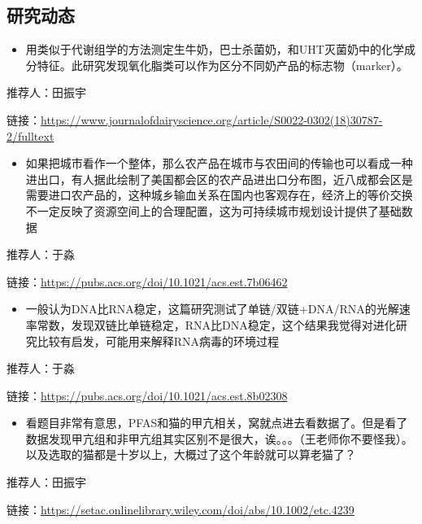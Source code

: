 \documentclass[]{book}
\providecommand{\tightlist}{%
  \setlength{\itemsep}{0pt}\setlength{\parskip}{0pt}}
\begin{document}
\hypertarget{ux7814ux7a76ux52a8ux6001-10}{%
\subsection*{研究动态}\label{ux7814ux7a76ux52a8ux6001-10}}

\begin{itemize}
\tightlist
\item
  用类似于代谢组学的方法测定生牛奶，巴士杀菌奶，和UHT灭菌奶中的化学成分特征。此研究发现氧化脂类可以作为区分不同奶产品的标志物（marker）。
\end{itemize}

推荐人：田振宇

链接：\url{https://www.journalofdairyscience.org/article/S0022-0302(18)30787-2/fulltext}

\begin{itemize}
\tightlist
\item
  如果把城市看作一个整体，那么农产品在城市与农田间的传输也可以看成一种进出口，有人据此绘制了美国都会区的农产品进出口分布图，近八成都会区是需要进口农产品的，这种城乡输血关系在国内也客观存在，经济上的等价交换不一定反映了资源空间上的合理配置，这为可持续城市规划设计提供了基础数据
\end{itemize}

推荐人：于淼

链接：\url{https://pubs.acs.org/doi/10.1021/acs.est.7b06462}

\begin{itemize}
\tightlist
\item
  一般认为DNA比RNA稳定，这篇研究测试了单链/双链+DNA/RNA的光解速率常数，发现双链比单链稳定，RNA比DNA稳定，这个结果我觉得对进化研究比较有启发，可能用来解释RNA病毒的环境过程
\end{itemize}

推荐人：于淼

链接：\url{https://pubs.acs.org/doi/10.1021/acs.est.8b02308}

\begin{itemize}
\tightlist
\item
  看题目非常有意思，PFAS和猫的甲亢相关，窝就点进去看数据了。但是看了数据发现甲亢组和非甲亢组其实区别不是很大，诶。。。（王老师你不要怪我）。以及选取的猫都是十岁以上，大概过了这个年龄就可以算老猫了？
\end{itemize}

推荐人：田振宇

链接：\url{https://setac.onlinelibrary.wiley.com/doi/abs/10.1002/etc.4239}
\end{document}
